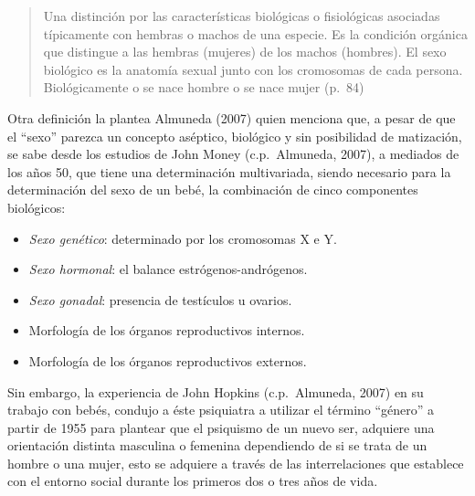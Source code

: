 \begin{quote}
    Una distinción por las características biológicas o fisiológicas asociadas
    típicamente con hembras o machos de una especie.
    Es la condición orgánica que distingue a las hembras (mujeres) de los machos
    (hombres).
    El sexo biológico es la anatomía sexual junto con los cromosomas de cada
    persona.
    Biológicamente o se nace hombre o se nace mujer (p.~84)
\end{quote}

Otra definición la plantea Almuneda (2007) quien menciona que, a pesar de que el
“sexo” parezca un concepto aséptico, biológico y sin posibilidad de matización,
se sabe desde los estudios de John Money (c.p.~Almuneda, 2007), a mediados
de los años 50, que tiene una determinación multivariada, siendo necesario para
la determinación del sexo de un bebé, la combinación de cinco componentes
biológicos:

\begin{itemize}
    \item \emph{Sexo genético}: determinado por los cromosomas X e Y.
    \item \emph{Sexo hormonal}: el balance estrógenos-andrógenos.
    \item \emph{Sexo gonadal}: presencia de testículos u ovarios.
    \item Morfología de los órganos reproductivos internos.
    \item Morfología de los órganos reproductivos externos.
\end{itemize}

Sin embargo, la experiencia de John Hopkins (c.p.~Almuneda, 2007) en su trabajo
con bebés, condujo a éste psiquiatra a utilizar el término “género” a partir de
1955 para plantear que el psiquismo de un nuevo ser, adquiere una orientación
distinta masculina o femenina dependiendo de si se trata de un hombre o una
mujer, esto se adquiere a través de las interrelaciones que establece con el
entorno social durante los primeros dos o tres años de vida.

